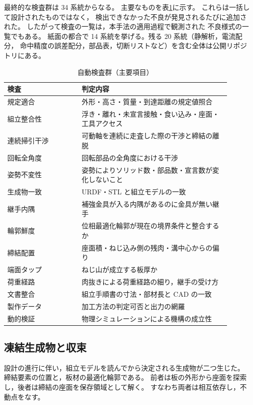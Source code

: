 \documentclass[a4paper,10pt,twocolumn]{ltjsarticle}
\begin{document}
最終的な検査群は 34 系統からなる。
主要なものを表\ref{tab:checks}に示す。
これらは一括して設計されたものではなく，
検出できなかった不良が発見されるたびに追加された。
したがって検査の一覧は，本手法の適用過程で観測された
不良様式の一覧でもある。
紙面の都合で 14 系統を挙げる。残る 20 系統（静解析，電流配分，
命中精度の誤差配分，部品表，切断リストなど）を含む全体は公開リポジトリにある。

\begin{table}[t]
\centering\footnotesize
\caption{自動検査群（主要項目）}
\label{tab:checks}
\begin{tabular}{p{0.30\linewidth}p{0.60\linewidth}}
\toprule
検査 & 判定内容\\
\midrule
規定適合 & 外形・高さ・質量・到達距離の規定値照合\\
組立整合性 & 浮き・離れ・未宣言接触・食い込み・座面・工具アクセス\\
連続掃引干渉 & 可動軸を連続に走査した際の干渉と締結の離脱\\
回転全角度 & 回転部品の全角度における干渉\\
姿勢不変性 & 姿勢によりソリッド数・部品数・宣言数が変化しないこと\\
生成物一致 & URDF・STL と組立モデルの一致\\
継手内隅 & 補強金具が入る内隅があるのに金具が無い継手\\
輪郭鮮度 & 位相最適化輪郭が現在の境界条件と整合するか\\
締結配置 & 座面積・ねじ込み側の残肉・溝中心からの偏り\\
端面タップ & ねじ山が成立する板厚か\\
荷重経路 & 肉抜きによる荷重経路の細り，継手の受け方\\
文書整合 & 組立手順書の寸法・部材長と CAD の一致\\
製作データ & 加工方法の判定可否と出力の網羅\\
動的検証 & 物理シミュレーションによる機構の成立性\\
\bottomrule
\end{tabular}
\end{table}

\subsection{凍結生成物と収束}
\label{sec:freeze}

設計の進行に伴い，組立モデルを読んでから決定される生成物が二つ生じた。
締結要素の位置と，板材の最適化輪郭である。
前者は板の外形から座面を探索し，後者は締結の座面を保存領域として解く。
すなわち両者は相互依存し，不動点をなす。
\end{document}
